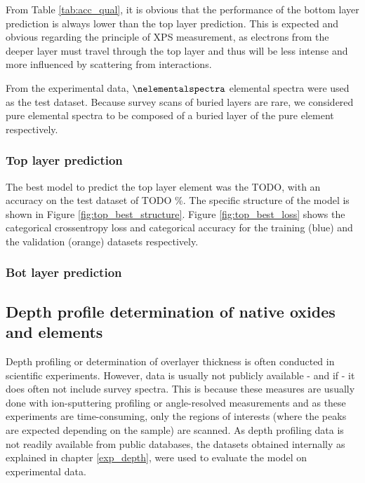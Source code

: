 From Table \ref{tab:acc_qual}, it is obvious that the performance of the bottom layer prediction is always lower than the top layer prediction. This is expected and obvious regarding the principle of XPS measurement, as electrons from the deeper layer must travel through the top layer and thus will be less intense and more influenced by scattering from interactions.

From the experimental data, $\nelementalspectra$ elemental spectra were used as the test dataset. Because survey scans of buried layers are rare, we considered pure elemental spectra to be composed of a buried layer of the pure element respectively.

\subsubsection{Top layer prediction}
The best model to predict the top layer element was the TODO, with an accuracy on the test dataset of TODO \%. The specific structure of the model is shown in Figure \ref{fig:top_best_structure}. Figure \ref{fig:top_best_loss} shows the categorical crossentropy loss and categorical accuracy for the training (blue) and the validation (orange) datasets respectively. 

\subsubsection{Bot layer prediction}


\subsection{Depth profile determination of native oxides and elements}
Depth profiling or determination of overlayer thickness is often conducted in scientific experiments. However, data is usually not publicly available - and if - it does often not include survey spectra. This is because these measures are usually done with ion-sputtering profiling or angle-resolved measurements and as these experiments are time-consuming, only the regions of interests (where the peaks are expected depending on the sample) are scanned.
As depth profiling data is not readily available from public databases, the datasets obtained internally as explained in chapter \ref{exp_depth}, were used to evaluate the model on experimental data.


